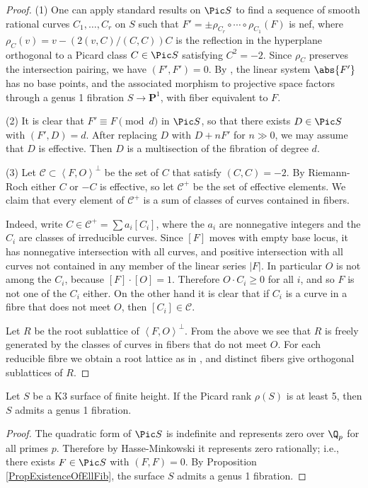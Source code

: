 \documentclass{article}
\def\P{\mathbf{P}}
\newcommand{\class}[1]{\left< #1 \right>}
\begin{document}
\begin{proof} (1) One can apply standard results on $\Pic S$ \cite[Corollary 8.2.9]{huybrechts} to find a sequence of smooth rational curves $C_1,\dots,C_r$ on $S$ such that $F'=\pm \rho_{C_r}\circ\cdots\circ \rho_{C_1} (F)$ is %
nef, where $\rho_C(v)=v-(2(v,C)/(C,C))C$ is the reflection in the hyperplane orthogonal to a Picard class $C \in \Pic S$ satisfying $C^2 = -2$.  Since $\rho_C$ preserves the intersection pairing, we have $(F',F')=0$.  By \cite[Proposition 2.3.10]{huybrechts}, the linear system $\abs{F'}$ has no base points, and the associated morphism to projective space factors through a genus 1 fibration $S\to \P^1$, with fiber equivalent to $F$.

(2) It is clear that $F'\equiv F\pmod{d}$ in $\Pic S$, so that there exists $D\in \Pic S$ with $(F',D)=d$.  After replacing $D$ with $D+nF'$ for $n\gg 0$, we may assume that $D$ is effective.  Then $D$ is a multisection of the fibration of degree $d$.

(3) 
Let ${\mathcal C} \subset \class{F,O}^\perp$ be the set of $C$ that satisfy
$(C,C) = -2$.  By Riemann-Roch either $C$ or $-C$ is effective, so let
${\mathcal C}^+$ be the set of effective elements.  We claim that every 
element of ${\mathcal C}^+$ is a sum of classes of curves contained in fibers.

Indeed, write $C \in {\mathcal C}^+ = \sum a_i [C_i]$, where the $a_i$ are
nonnegative integers and the $C_i$ are classes of irreducible curves.
Since $[F]$ moves with empty base locus, it has nonnegative intersection
with all curves, and positive intersection with all curves not contained in
any member of the linear series $|F|$.  In particular $O$ is not among the
$C_i$, because $[F]\cdot[O] = 1$.
Therefore $O \cdot C_i \ge 0$ for all $i$, and so $F$ is not one of
the $C_i$ either.  On the other hand it is clear that if $C_i$ is a
curve in a fibre that does not meet $O$, then $[C_i] \in {\mathcal C}$.

Let $R$ be the root sublattice of $\class{F,O}^\perp$.  From the above we see
that $R$ is freely generated by the classes of curves in fibers that do not
meet $O$.  For each reducible fibre we obtain a root lattice as in
\cite[\S11.13]{SchuettShioda}, and distinct fibers give orthogonal
sublattices of $R$.
\end{proof}

\begin{cor} Let $S$ be a K3 surface of finite height.   If the Picard rank $\rho(S)$ is at least 5, then $S$ admits a genus 1 fibration.
\end{cor}
\begin{proof} The quadratic form of $\Pic S$ is indefinite and represents zero over $\Q_p$ for all primes $p$.  Therefore by Hasse-Minkowski it represents zero rationally; i.e., there exists $F\in \Pic S$ with $(F,F)=0$.  By Proposition \ref{PropExistenceOfEllFib}, the surface $S$ admits a genus 1 fibration.
\end{proof}
\end{document}
